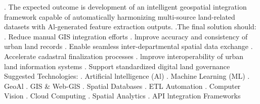 \documentclass[10pt,a4paper]{article}
\begin{document}
\begin{tcolorbox}[pscard, title={"\textbf{SIH26013} \quad $\vert$ \quad Automated lntegration and lntelligent Harmonization of Multi-source Geospat...}]
\noindent\small . The expected outcome is development of an intelligent geospatial integration framework capable of automatically harmonizing multi-source land-related datasets with Al-generated feature extraction outputs. .The final solution should: . Reduce manual GIS integration efforts . lmprove accuracy and consistency of urban land records . Enable seamless inter-departmental spatial data exchange . Accelerate cadastral finalization processes . lmprove interoperability of urban land information systems . Support standardized digital land governance Suggested Technologies: . Artificial lntelligence (Al) . Machine Learning (ML) . GeoAl . GIS \& Web-GlS . Spatial Databases . ETL Automation . Computer Vision . Cloud Computing . Spatial Analytics . API lntegration Frameworks\par\vspace{0.06cm}

\end{tcolorbox}
\vspace{0.4cm}
{}
\end{document}
